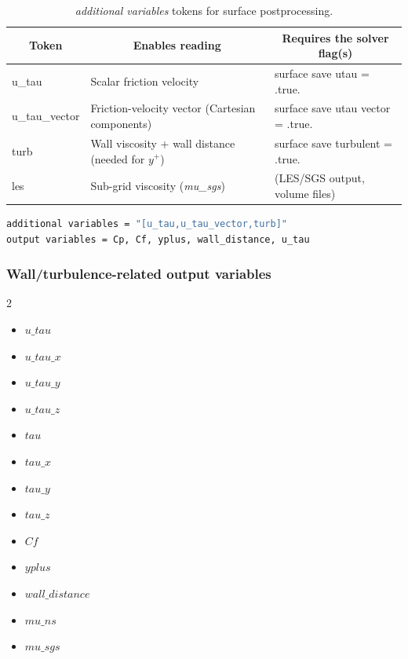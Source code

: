 \documentclass[a4paper,10pt]{report}
\begin{document}
\begin{longtable}{|p{3.2cm}|p{6.5cm}|p{4.5cm}|}
\caption{\textit{additional variables} tokens for surface postprocessing.} \label{tab:additionalvariables} \\
\hline
\multicolumn{1}{|c|}{\textbf{Token}} & \multicolumn{1}{c|}{\textbf{Enables reading}} & \multicolumn{1}{c|}{\textbf{Requires the solver flag(s)}} \\ \hline
\endfirsthead

u\_tau 	& Scalar friction velocity & surface save utau = .true. \\ \hline

u\_tau\_vector 	& Friction-velocity vector (Cartesian components) & surface save utau vector = .true. \\ \hline

turb 	& Wall viscosity + wall distance (needed for $y^+$) & surface save turbulent = .true. \\ \hline

les 	& Sub-grid viscosity (\textit{mu\_sgs}) & (LES/SGS output, volume files) \\ \hline
\end{longtable}

\begin{lstlisting}[language=bash]
additional variables = "[u_tau,u_tau_vector,turb]"
output variables = Cp, Cf, yplus, wall_distance, u_tau
\end{lstlisting}

\subsubsection{Wall/turbulence-related output variables}

\begin{multicols}{2}
\begin{itemize}
\item $u\_tau$
\item $u\_tau\_x$
\item $u\_tau\_y$
\item $u\_tau\_z$
\item $tau$
\item $tau\_x$
\item $tau\_y$
\item $tau\_z$
\item $Cf$
\item $yplus$
\item $wall\_distance$
\item $mu\_ns$
\item $mu\_sgs$
\end{itemize}
\end{multicols}
\end{document}
